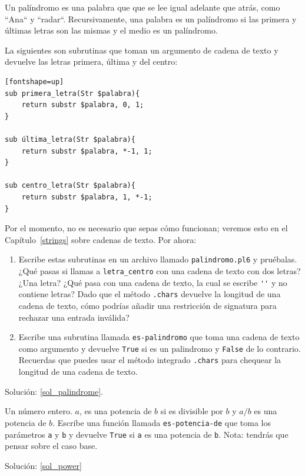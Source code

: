\begin{exercise}
\label{palindrome}

Un palíndromo es una palabra que que se lee igual adelante que atrás,
como ``Ana`` y ``radar``. Recursivamente, una palabra es un palíndromo
si las primera y últimas letras son las mismas y el medio es un palíndromo.

La siguientes son subrutinas que toman un argumento de cadena de texto
y devuelve las letras primera, última y del centro:

\begin{verbatim}[fontshape=up]
sub primera_letra(Str $palabra){
    return substr $palabra, 0, 1;
}

sub última_letra(Str $palabra){
    return substr $palabra, *-1, 1;
}

sub centro_letra(Str $palabra){
    return substr $palabra, 1, *-1;
}
\end{verbatim}
%
Por el momento, no es necesario que sepas cómo funcionan; veremos esto en el 
Capítulo~\ref{strings} sobre cadenas de texto. Por ahora:

\begin{enumerate}

\item Escribe estas subrutinas en un archivo llamado 
{\tt palindromo.pl6} y pruébalas. ¿Qué pasas si llamas 
a \verb|letra_centro| con una cadena de texto con dos letras?
¿Una letra? ¿Qué pasa con una cadena de texto, la cual se escribe
\verb|''| y no contiene letras? Dado que el método {\tt .chars}
devuelve la longitud de una cadena de texto, cómo podrías añadir
una restricción de signatura para rechazar una entrada inválida?

\item Escribe una subrutina llamada \verb|es-palindromo| que toma
una cadena de texto como argumento y devuelve {\tt True} si es 
un palindromo y {\tt False} de lo contrario. Recuerdas que puedes
usar el método integrado {\tt .chars} para chequear la longitud 
de una cadena de texto.

\end{enumerate}

Solución: \ref{sol_palindrome}.

\end{exercise}

\begin{exercise}
\label{power}

Un número entero. $a$, es una potencia de $b$ si es divisible 
por $b$ y $a/b$ es una potencia de $b$. Escribe una función llamada
\verb|es-potencia-de| que toma los parámetros {\tt a} y {\tt b}
y devuelve {\tt True} si {\tt a} es una potencia de {\tt b}.
Nota: tendrás que pensar sobre el caso base.

Solución: \ref{sol_power}

\end{exercise}


